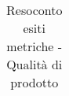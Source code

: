 \begin{longtable}{|>{\centering\arraybackslash}p{2cm}|>{\centering\arraybackslash}p{5cm}|>{\centering\arraybackslash}p{3cm}|>{\centering\arraybackslash}p{3cm}|}
			\caption{Resoconto esiti metriche - Qualità di prodotto}
		\end{longtable}